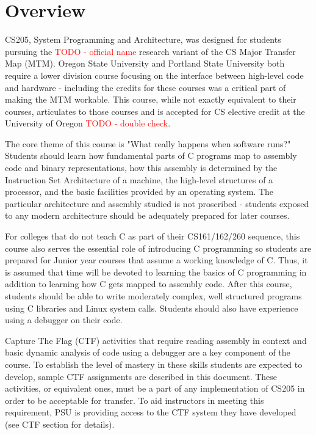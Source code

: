 \documentclass[12pt,letterpaper]{article}
\begin{document}
	\section*{Overview}

	CS205, System Programming and Architecture, was designed for students pursuing the \textcolor{red}{TODO - official name} research variant of the CS Major Transfer Map (MTM). Oregon State University and Portland State University both require a lower division course focusing on the interface between high-level code and hardware - including the credits for these courses was a critical part of making the MTM workable. This course, while not exactly equivalent to their courses, articulates to those courses and is accepted for CS elective credit at the University of Oregon \textcolor{red}{TODO - double check}.
	 
	The core theme of this course is "What really happens when software runs?" Students should learn how fundamental parts of C programs map to assembly code and binary representations, how this assembly is determined by the Instruction Set Architecture of a machine, the high-level structures of a processor, and the basic facilities provided by an operating system. The particular architecture and assembly studied is not proscribed - students exposed to any modern architecture should be adequately prepared for later courses.

	For colleges that do not teach C as part of their CS161/162/260 sequence, this course also serves the essential role of introducing C programming so students are prepared for Junior year courses that assume a working knowledge of C. Thus, it is assumed that time will be devoted to learning the basics of C programming in addition to learning how C gets mapped to assembly code. After this course, students should be able to write moderately complex, well structured programs using C libraries and Linux system calls. Students should also have experience using a debugger on their code.
	
	Capture The Flag (CTF) activities that require reading assembly in context and basic dynamic analysis of code using a debugger are a key component of the course. To establish the level of mastery in these skills students are expected to develop, sample CTF assignments are described in this document. These activities, or equivalent ones, must be a part of any implementation of CS205 in order to be acceptable for transfer. To aid instructors in meeting this requirement, PSU is providing access to the CTF system they have developed (see CTF section for details).
	
\end{document}
